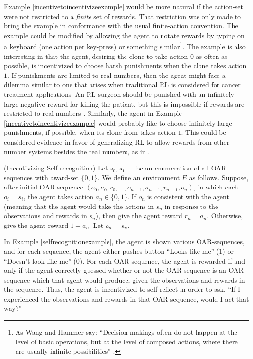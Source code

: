 \documentclass[runningheads]{llncs}
\begin{document}
Example \ref{incentivetoincentivizeexample} would be more natural if the action-set were
not restricted to a \emph{finite} set of rewards.
That restriction was only made to bring the example in conformance with the usual
finite-action convention.
The example could be modified by allowing
the agent to notate rewards by typing on a keyboard (one action per key-press) or something
similar\footnote{As Wang and Hammer say: ``Decision makings often do not happen
at the level of basic operations, but at the level of composed actions, where
there are usually infinite possibilities'' \cite{wang2015assumptions}.}.
The example is also interesting in that the agent, desiring the clone to take action $0$
as often as possible, is incentivized to choose harsh punishments when the clone takes
action $1$. If punishments are limited to real numbers, then the agent might face a dilemma
similar to one that arises when traditional RL is considered for cancer treatment applications.
An RL surgeon should be punished with an infinitely large negative reward for killing
the patient, but this is impossible if rewards are restricted to real numbers
\cite{wirth2017survey} \cite{zhao2009reinforcement}. Similarly, the agent in Example
\ref{incentivetoincentivizeexample} would probably like to choose infinitely large
punishments, if possible, when its clone from takes action $1$. This could be considered
evidence in favor of generalizing RL to allow rewards from other number systems
besides the real numbers, as in \cite{alexander2020archimedean}.

\begin{example}
\label{selfrecognitionexample}
    (Incentivizing Self-recognition)
    Let $s_0,s_1,\ldots$ be an enumeration of all OAR-sequences with award-set
    $\{0,1\}$. We define an environment $E$ as follows.
    Suppose, after initial OAR-sequence $(o_0,a_0,r_0,\ldots,o_{n-1},a_{n-1},r_{n-1},o_n)$,
    in which each $o_i=s_i$,
    the agent takes action $a_n\in\{0,1\}$. If $o_n$ is consistent with the agent
    (meaning that the agent would take the actions in $s_n$ in response to the observations
    and rewards in $s_n$), then give the agent reward $r_n=a_n$.
    Otherwise, give the agent reward $1-a_n$. Let $o_n=s_n$.
\end{example}

In Example \ref{selfrecognitionexample}, the agent is shown various OAR-sequences, and for
each sequence, the agent either pushes button ``Looks like me'' ($1$)
or ``Doesn't look like me'' ($0$). For each OAR-sequence, the agent is rewarded if and
only if the agent correctly guessed whether or not the OAR-sequence is an OAR-sequence
which that agent would produce, given the observations and rewards in the sequence.
Thus, the agent is incentivized to self-reflect in order to ask, ``If I experienced the
observations and rewards in that OAR-sequence, would I act that way?''
\end{document}
